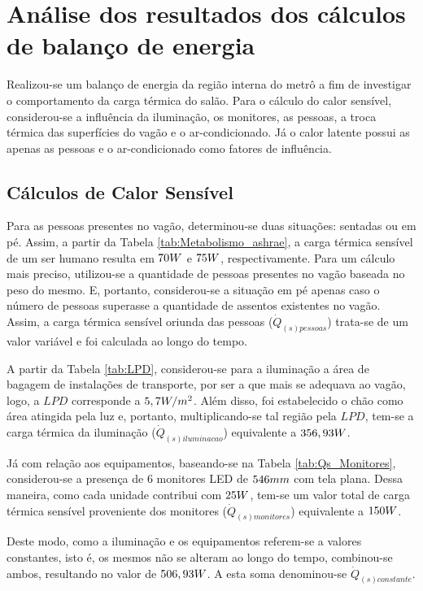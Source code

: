 \documentclass[acronym,symbols,table]{fei}
\begin{document}
\newpage

\section{Análise dos resultados dos cálculos de balanço de energia} \label{equações}

Realizou-se um balanço de energia da região interna do metrô a fim de investigar o comportamento da carga térmica do salão. Para o cálculo do calor sensível, considerou-se a influência da iluminação, os monitores, as pessoas, a troca térmica das superfícies do vagão e o ar-condicionado. Já o calor latente possui as apenas as pessoas e o ar-condicionado como fatores de influência.

\subsection{Cálculos de Calor Sensível}

Para as pessoas presentes no vagão, determinou-se duas situações: sentadas ou em pé. Assim, a partir da Tabela \ref{tab:Metabolismo_ashrae}, a carga térmica sensível de um ser humano resulta em $70 \space W$ e $75 \space W$, respectivamente. Para um cálculo mais preciso, utilizou-se a quantidade de pessoas presentes no vagão baseada no peso do mesmo. E, portanto, considerou-se a situação em pé apenas caso o número de pessoas superasse a quantidade de assentos existentes no vagão. Assim, a carga térmica sensível oriunda das pessoas ($\dot{Q}_{(s)pessoas}$) trata-se de um valor variável e foi calculada ao longo do tempo. 

A partir da Tabela \ref{tab:LPD}, considerou-se para a iluminação a área de bagagem de instalações de transporte, por ser a que mais se adequava ao vagão, logo, a $LPD$ corresponde a $5,7 \space W/m^2$. Além disso, foi estabelecido o chão como área atingida pela luz e, portanto, multiplicando-se tal região pela $LPD$, tem-se a carga térmica da iluminação ($\dot{Q}_{(s)iluminacao}$) equivalente a $356,93 \space W$.

Já com relação aos equipamentos, baseando-se na Tabela \ref{tab:Qs_Monitores}, considerou-se a presença de 6 monitores LED de $546 \space mm$ com tela plana. Dessa maneira, como cada unidade contribui com $25 \space W$, tem-se um valor total de carga térmica sensível proveniente dos monitores ($\dot{Q}_{(s)monitores}$) equivalente a $150 \space W$.

Deste modo, como a iluminação e os equipamentos referem-se a valores constantes, isto é, os mesmos não se alteram ao longo do tempo, combinou-se ambos, resultando no valor de $506,93 \space W$. A esta soma denominou-se $\dot{Q}_{(s)constante}$.
\end{document}

